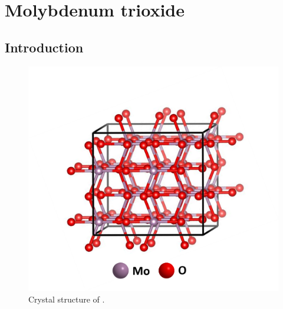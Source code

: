 \section{Molybdenum trioxide}

\subsection{Introduction}

 \begin{figure}[th!]
  \centering
  \includegraphics[width=\textwidth]{Figures/chap6fig/MoO3crys}
    \caption{Crystal structure of .}
  \label{Figures/chap6fig:MoO3crys}
\end{figure}

